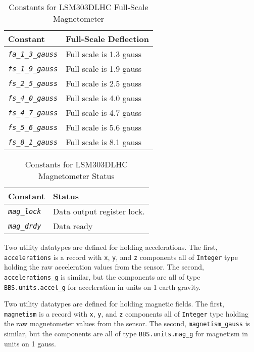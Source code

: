 \documentclass[10pt, openany]{book}
\newcommand{\constant}[1]{\emph{\texttt{#1}}}
\newcommand{\datatype}[1]{\texttt{#1}}
\begin{document}
\begin{table}[!h]
\begin{center}
  \begin{tabular}{l|l}
    Constant & Full-Scale Deflection \\
    \hline
    \constant{fa\_1\_3\_gauss} & Full scale is 1.3 gauss \\
    \constant{fs\_1\_9\_gauss} & Full scale is 1.9 gauss \\
    \constant{fs\_2\_5\_gauss} & Full scale is 2.5 gauss \\
    \constant{fs\_4\_0\_gauss} & Full scale is 4.0 gauss\\
    \constant{fs\_4\_7\_gauss} & Full scale is 4.7 gauss \\
    \constant{fs\_5\_6\_gauss} & Full scale is 5.6 gauss \\
    \constant{fs\_8\_1\_gauss} & Full scale is 8.1 gauss\\
  \end{tabular}
  \caption{Constants for LSM303DLHC Full-Scale Magnetometer}
  \label{tbl:LSM303DLHCmfs}
\end{center}
\end{table}

\begin{table}[!h]
\begin{center}
  \begin{tabular}{l|l}
    Constant & Status \\
    \hline
    \constant{mag\_lock} & Data output register lock. \\
    \constant{mag\_drdy} & Data ready \\
  \end{tabular}
  \caption{Constants for LSM303DLHC Magnetometer Status}
  \label{tbl:LSM303DLHCmStat}
\end{center}
\end{table}

Two utility datatypes are defined for holding accelerations.  The first,  \datatype{accelerations} is a record with \datatype{x}, \datatype{y}, and \datatype{z} components all of \datatype{Integer} type holding the raw acceleration values from the sensor.  The second, \datatype{accelerations\_g} is similar, but the components are all of type \datatype{BBS.units.accel\_g} for acceleration in units on 1 earth gravity.

Two utility datatypes are defined for holding magnetic fields.  The first,  \datatype{magnetism} is a record with \datatype{x}, \datatype{y}, and \datatype{z} components all of \datatype{Integer} type holding the raw magnetometer values from the sensor.  The second, \datatype{magnetism\_gauss} is similar, but the components are all of type \datatype{BBS.units.mag\_g} for magnetism in units on 1 gauss.
\end{document}
